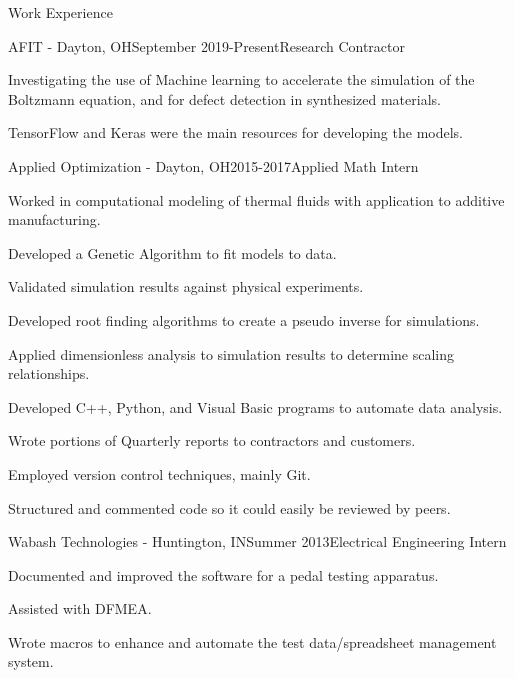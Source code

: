 \documentclass{resume} %
\begin{document}
\begin{rSection}{Work Experience}

\begin{rSubsection}{AFIT - Dayton, OH}{September 2019-Present}{Research Contractor}{}
\item Investigating the use of Machine learning to accelerate the simulation of the Boltzmann equation, and for defect detection in synthesized materials. 
\item TensorFlow and Keras were the main resources for developing the models.
\end{rSubsection}

\begin{rSubsection}{Applied Optimization - Dayton, OH}{2015-2017}{Applied Math Intern}{}
\item Worked in computational modeling of thermal fluids with application to additive manufacturing.
\item Developed a Genetic Algorithm to fit models to data.
\item Validated simulation results against physical experiments.
\item Developed root finding algorithms to create a pseudo inverse for simulations.
\item Applied dimensionless analysis to simulation results to determine scaling relationships.
\item Developed C++, Python, and Visual Basic programs to automate data analysis.
\item Wrote portions of Quarterly reports to contractors and customers.
\item Employed version control techniques, mainly Git.
\item Structured and commented code so it could easily be reviewed by peers.
\end{rSubsection}

\begin{rSubsection}{Wabash Technologies - Huntington, IN}{Summer 2013}{Electrical Engineering Intern}{}
\item Documented and improved the software for a pedal testing apparatus.
\item Assisted with DFMEA.
\item Wrote macros to enhance and automate the test data/spreadsheet management system.
\end{rSubsection}


\end{rSection}
\end{document}
